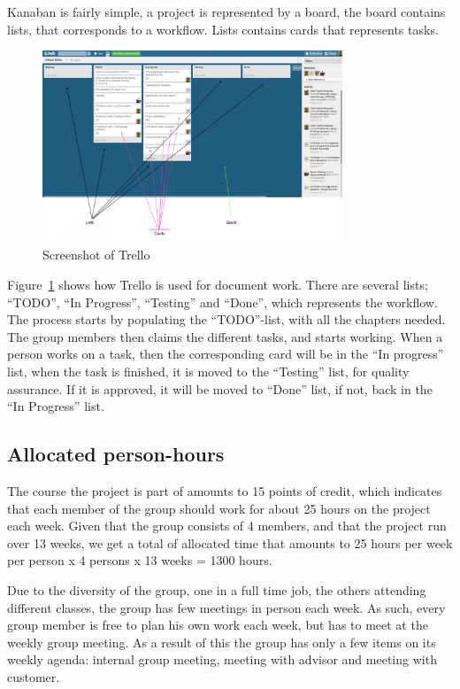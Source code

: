 \documentclass[11pt]{book}
\begin{document}
Kanaban is fairly simple, a project is represented by a board, the board contains lists, that corresponds to a workflow. Lists contains cards that represents tasks.

\begin{figure}[H]
      \centering
      \includegraphics[width=0.8\textwidth]{Figures/trello.png}
      \caption{Screenshot of Trello}
      \label{fig:tools_trello}
\end{figure}

Figure~\ref{fig:tools_trello} shows how Trello is used for document work. There are several lists; ``TODO'', ``In Progress'', ``Testing'' and ``Done'', which represents the workflow. The process starts by populating the ``TODO''-list, with all the chapters needed. The group members then claims the different tasks, and starts working. When a person works on a task, then the corresponding card will be in the ``In progress'' list, when the task is finished, it is moved to the ``Testing'' list, for quality assurance. If it is approved, it will be moved to ``Done'' list, if not, back in the ``In Progress'' list.

\subsection{Allocated person-hours}
The course the project is part of amounts to 15 points of credit, which indicates that each member of the group should work for about 25 hours on the project each week. Given that the group consists of 4 members, and that the project run over 13 weeks, we get a total of allocated time that amounts to 25 hours per week per person x 4 persons x 13 weeks = 1300 hours.

Due to the diversity of the group, one in a full time job, the others attending different classes, the group has few meetings in person each week. As such, every group member is free to plan his own work each week, but has to meet at the weekly group meeting. As a result of this the group has only a few items on its weekly agenda: internal group meeting, meeting with advisor and meeting with customer.
\end{document}
